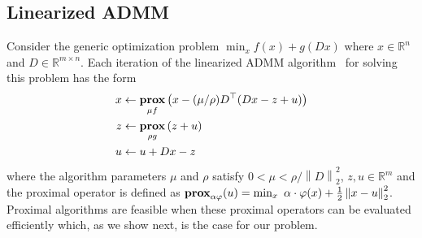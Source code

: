\documentclass[letterpaper]{article} %
\newcommand{\autoref}{\Cref}
\newcommand{\norm}[1]{\left\lVert #1 \right\rVert}
\DeclareMathOperator*{\prox}{\bf prox}
\begin{document}
\subsection{Linearized ADMM}
\label{sec:linADMM}


Consider the generic optimization problem
$\min_x f(x)+g(Dx)$
where $x\in \mathbb{R}^n$ and $D\in \mathbb{R}^{m\times n}$. Each
iteration of the linearized ADMM
algorithm~\cite{parikh_proximal_2014} for solving this problem 
has the form
\begin{equation}
  \label{eq:linADMM_steps}
  \begin{aligned}
    x & \leftarrow \prox_{\mu f} \left(x - (\mu/\rho)D^\top (D x - z + u )\right)\\
    z & \leftarrow \prox_{\rho g} \left(z + u\right)\\
    u & \leftarrow u + D x - z
  \end{aligned}
\end{equation}
where the algorithm parameters $\mu$ and $\rho$ satisfy $0 < \mu <
\rho/\norm{D}_2^2$, $z,u\in \mathbb{R}^m$ and the proximal operator is
defined as $\prox_{\alpha \varphi}(u) = \min_x \,\, \alpha \cdot
\varphi(x)+\frac{1}{2} \norm{ x-u}_2^2$. Proximal algorithms are feasible
when these proximal operators can be evaluated efficiently which, as
we show next, is the case for our problem.  

 
\end{document}
